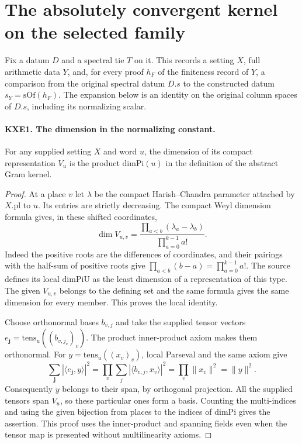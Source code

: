 \section{The absolutely convergent kernel on the selected family}
Fix a datum $D$ and a spectral tie $T$ on it. This records a setting
$X$, full arithmetic data $Y$, and, for every proof $h_F$ of the
finiteness record of $Y$, a comparison from the original spectral
datum $D.s$ to the constructed datum $s_Y=\mathrm{sOf}(h_F)$.
The expansion below is an identity on the original column spaces
of $D.s$, including its normalizing scalar.

\paragraph{KXE1. The dimension in the normalizing constant.}
For any supplied setting $X$ and word $u$, the dimension of its
compact representation $V_u$ is the product $\mathrm{dimPi}(u)$
in the definition of the abstract Gram kernel.
\begin{proof}
At a place $v$ let $\lambda$ be the compact Harish--Chandra parameter
attached by $X.\mathrm{pl}$ to $u$. Its entries are strictly decreasing.
The compact Weyl dimension formula gives, in these shifted coordinates,
\[
            \dim V_{u,v}=
        \frac{\prod_{a<b}(\lambda_a-\lambda_b)}
             {\prod_{a=0}^{k-1}a!}.
\]
Indeed the positive roots are the differences of coordinates,
and their pairings with the half-sum of positive roots give
$\prod_{a<b}(b-a)=\prod_{a=0}^{k-1}a!$. The source defines its
local $\mathrm{dimPiU}$ as the least dimension of a representation
of this type. The given $V_{u,v}$ belongs to the defining set and
the same formula gives the same dimension for every member.
This proves the local identity.

Choose orthonormal bases $b_{v,j}$ and take the supplied tensor
vectors $e_{\mathbf j}=\mathrm{tens}_u((b_{v,j_v})_v)$.
The product inner-product axiom makes them orthonormal. For
$y=\mathrm{tens}_u((x_v)_v)$, local Parseval and the same axiom give
\[
 \sum_{\mathbf j}|\langle e_{\mathbf j},y\rangle|^2
 =\prod_v\sum_j|\langle b_{v,j},x_v\rangle|^2
 =\prod_v\|x_v\|^2=\|y\|^2 .
\]
Consequently $y$ belongs to their span, by orthogonal projection.
All the supplied tensors span $V_u$, so these particular ones form
a basis. Counting the multi-indices and using the given bijection
from places to the indices of $\mathrm{dimPi}$ gives the assertion.
This proof uses the inner-product and spanning fields even when the
tensor map is presented without multilinearity axioms.
\end{proof}

